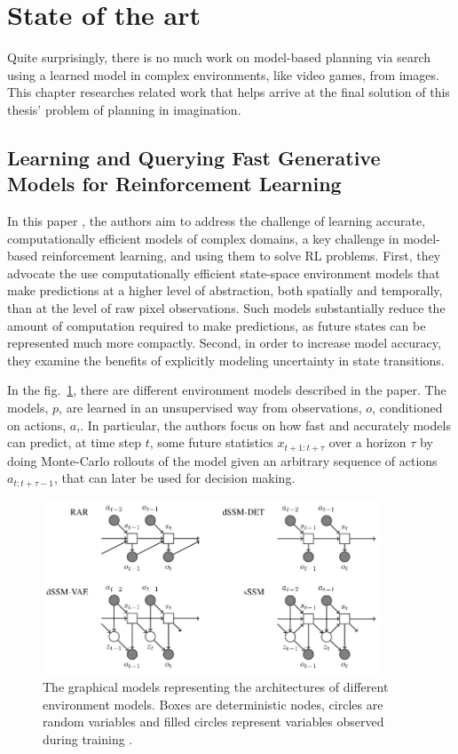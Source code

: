 \section{State of the art}

Quite surprisingly, there is no much work on model-based planning via search using a learned model in complex environments, like video games, from images. This chapter researches related work that helps arrive at the final solution of this thesis' problem of planning in imagination.

\subsection{Learning and Querying Fast Generative Models for Reinforcement Learning}

In this paper \cite{Algo.FastGenerativeModels}, the authors aim to address the challenge of learning accurate, computationally efficient models of complex domains, a key challenge in model-based reinforcement learning, and using them to solve RL problems. First, they advocate the use computationally efficient state-space environment models that make predictions at a higher level of abstraction, both spatially and temporally, than at the level of raw pixel observations. Such models substantially reduce the amount of computation required to make predictions, as future states can be represented much more compactly. Second, in order to increase model accuracy, they examine the benefits of explicitly modeling uncertainty in state transitions.

In the fig.~\ref{Fig.FastGenerativeModels}, there are different environment models described in the paper. The models, $p$, are learned in an unsupervised way from observations, $o$, conditioned on actions, $a$,. In particular, the authors focus on how fast and accurately models can predict, at time step $t$, some future statistics $x_{t+1:t+\tau}$ over a horizon $\tau$ by doing Monte-Carlo rollouts of the model given an arbitrary sequence of actions $a_{t:t+\tau−1}$, that can later be used for decision making.

\begin{figure}[H]
\includegraphics[width=0.9\textwidth,keepaspectratio]{figures/FastGenerativeModels.png}
\caption[Fast Generative Models]{The graphical models representing the architectures of different environment models. Boxes are deterministic nodes, circles are random variables and filled circles represent variables observed during training \protect\cite{Algo.FastGenerativeModels}.}
\label{Fig.FastGenerativeModels}
\end{figure}

